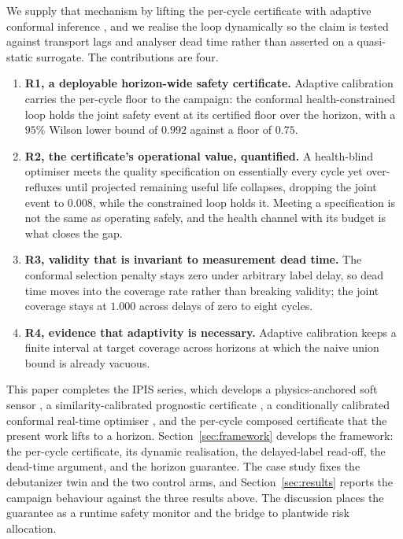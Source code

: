 We supply that mechanism by lifting the per-cycle certificate with adaptive conformal inference
\citep{gibbs2021}, and we realise the loop dynamically so the claim is tested against transport
lags and analyser dead time rather than asserted on a quasi-static surrogate. The contributions
are four.
\begin{enumerate}
\item \textbf{R1, a deployable horizon-wide safety certificate.} Adaptive calibration carries the
  per-cycle floor to the campaign: the conformal health-constrained loop holds the joint safety
  event at its certified floor over the horizon, with a $95\%$ Wilson lower bound of $0.992$
  against a floor of $0.75$.
\item \textbf{R2, the certificate's operational value, quantified.} A health-blind optimiser
  meets the quality specification on essentially every cycle yet over-refluxes until projected
  remaining useful life collapses, dropping the joint event to $0.008$, while the constrained
  loop holds it. Meeting a specification is not the same as operating safely, and the health
  channel with its budget is what closes the gap.
\item \textbf{R3, validity that is invariant to measurement dead time.} The conformal selection
  penalty stays zero under arbitrary label delay, so dead time moves into the coverage rate
  rather than breaking validity; the joint coverage stays at $1.000$ across delays of zero to
  eight cycles.
\item \textbf{R4, evidence that adaptivity is necessary.} Adaptive calibration keeps a finite
  interval at target coverage across horizons at which the naive union bound is already vacuous.
\end{enumerate}

This paper completes the IPIS series, which develops a physics-anchored soft sensor
\citep{busico_m1}, a similarity-calibrated prognostic certificate \citep{busico_m2}, a
conditionally calibrated conformal real-time optimiser \citep{busico_m3}, and the per-cycle
composed certificate \citep{busico_m4} that the present work lifts to a horizon.
Section~\ref{sec:framework} develops the framework: the per-cycle certificate, its dynamic
realisation, the delayed-label read-off, the dead-time argument, and the horizon guarantee. The
case study fixes the debutanizer twin and the two control arms, and Section~\ref{sec:results}
reports the campaign behaviour against the three results above. The discussion places the
guarantee as a runtime safety monitor and the bridge to plantwide risk allocation.
